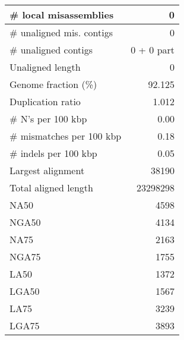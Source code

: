 \documentclass[12pt,a4paper]{article}
\begin{document}
\begin{table}[ht]
\begin{center}
\begin{tabular}{|l*{1}{|r}|}
\# local misassemblies & 0 \\ \hline
\# unaligned mis. contigs & 0 \\ \hline
\# unaligned contigs & 0 + 0 part \\ \hline
Unaligned length & 0 \\ \hline
Genome fraction (\%) & 92.125 \\ \hline
Duplication ratio & 1.012 \\ \hline
\# N's per 100 kbp & 0.00 \\ \hline
\# mismatches per 100 kbp & 0.18 \\ \hline
\# indels per 100 kbp & 0.05 \\ \hline
Largest alignment & 38190 \\ \hline
Total aligned length & 23298298 \\ \hline
NA50 & 4598 \\ \hline
NGA50 & 4134 \\ \hline
NA75 & 2163 \\ \hline
NGA75 & 1755 \\ \hline
LA50 & 1372 \\ \hline
LGA50 & 1567 \\ \hline
LA75 & 3239 \\ \hline
LGA75 & 3893 \\ \hline
\end{tabular}
\end{center}
\end{table}
\end{document}
